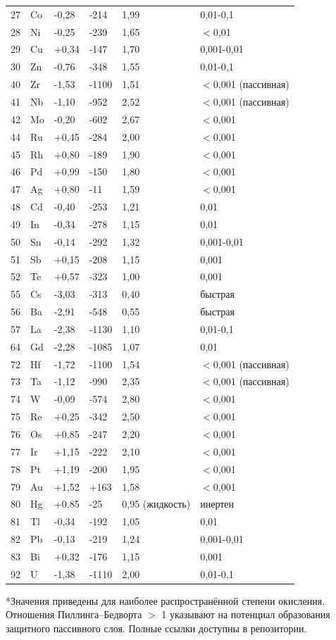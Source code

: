 \documentclass[12pt,a4paper]{article}
\begin{document}
\begin{longtable}{p{0.8cm}p{1.2cm}p{2.5cm}p{2.5cm}p{2.5cm}p{2.5cm}}
		27 & Co & -0,28 & -214 & 1,99 & 0,01-0,1 \\
		28 & Ni & -0,25 & -239 & 1,65 & $<$0,01 \\
		29 & Cu & +0,34 & -147 & 1,70 & 0,001-0,01 \\
		30 & Zn & -0,76 & -348 & 1,55 & 0,01-0,1 \\
		40 & Zr & -1,53 & -1100 & 1,51 & $<$0,001 (пассивная) \\
		41 & Nb & -1,10 & -952 & 2,52 & $<$0,001 (пассивная) \\
		42 & Mo & -0,20 & -602 & 2,67 & $<$0,001 \\
		44 & Ru & +0,45 & -284 & 2,00 & $<$0,001 \\
		45 & Rh & +0,80 & -189 & 1,90 & $<$0,001 \\
		46 & Pd & +0,99 & -150 & 1,80 & $<$0,001 \\
		47 & Ag & +0,80 & -11 & 1,59 & $<$0,001 \\
		48 & Cd & -0,40 & -253 & 1,21 & 0,01 \\
		49 & In & -0,34 & -278 & 1,15 & 0,01 \\
		50 & Sn & -0,14 & -292 & 1,32 & 0,001-0,01 \\
		51 & Sb & +0,15 & -208 & 1,15 & 0,001 \\
		52 & Te & +0,57 & -323 & 1,00 & 0,001 \\
		55 & Cs & -3,03 & -313 & 0,40 & быстрая \\
		56 & Ba & -2,91 & -548 & 0,55 & быстрая \\
		57 & La & -2,38 & -1130 & 1,10 & 0,01-0,1 \\
		64 & Gd & -2,28 & -1085 & 1,07 & 0,01 \\
		72 & Hf & -1,72 & -1100 & 1,54 & $<$0,001 (пассивная) \\
		73 & Ta & -1,12 & -990 & 2,35 & $<$0,001 (пассивная) \\
		74 & W  & -0,09 & -574 & 2,80 & $<$0,001 \\
		75 & Re & +0,25 & -342 & 2,50 & $<$0,001 \\
		76 & Os & +0,85 & -247 & 2,20 & $<$0,001 \\
		77 & Ir & +1,15 & -222 & 2,10 & $<$0,001 \\
		78 & Pt & +1,19 & -200 & 1,95 & $<$0,001 \\
		79 & Au & +1,52 & +163 & 1,58 & $<$0,001 \\
		80 & Hg & +0,85 & -25 & 0,95 (жидкость) & инертен \\
		81 & Tl & -0,34 & -192 & 1,05 & 0,01 \\
		82 & Pb & -0,13 & -219 & 1,24 & 0,001-0,01 \\
		83 & Bi & +0,32 & -176 & 1,15 & 0,001 \\
		92 & U  & -1,38 & -1110 & 2,00 & 0,01-0,1 \\
		\bottomrule
	\end{longtable}
	*Значения приведены для наиболее распространённой степени окисления. Отношения Пиллинга–Бедворта $>$ 1 указывают на потенциал образования защитного пассивного слоя. Полные ссылки доступны в репозитории.
	
\end{document}
